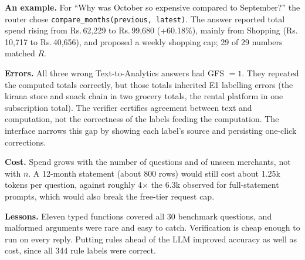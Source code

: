 \documentclass[conference]{IEEEtran}
\DeclareRobustCommand{\rupee}{Rs.\,}
\begin{document}
\begin{table}[t]
\caption{E3: QA correctness and numeric faithfulness}
\label{tab:qa}
\centering
{}
\end{table}


\textbf{An example.} For ``Why was October so expensive compared to September?'' the router chose \texttt{compare\_months(previous, latest)}. The answer reported total spend rising from \rupee 62,229 to \rupee 99,680 (+60.18\%), mainly from Shopping (\rupee 10,717 to \rupee 40,656), and proposed a weekly shopping cap; 29 of 29 numbers matched $R$.

\textbf{Errors.} All three wrong Text-to-Analytics answers had GFS $=1$. They repeated the computed totals correctly, but those totals inherited E1 labelling errors (the kirana store and snack chain in two grocery totals, the rental platform in one subscription total). The verifier certifies agreement between text and computation, not the correctness of the labels feeding the computation. The interface narrows this gap by showing each label's source and persisting one-click corrections.

\textbf{Cost.} Spend grows with the number of questions and of unseen merchants, not with $n$. A 12-month statement (about 800 rows) would still cost about 1.25k tokens per question, against roughly 4$\times$ the 6.3k observed for full-statement prompts, which would also break the free-tier request cap.

\textbf{Lessons.} Eleven typed functions covered all 30 benchmark questions, and malformed arguments were rare and easy to catch. Verification is cheap enough to run on every reply. Putting rules ahead of the LLM improved accuracy as well as cost, since all 344 rule labels were correct.
\end{document}
